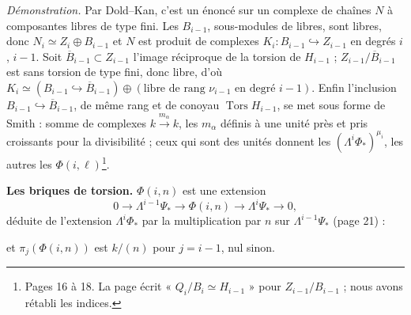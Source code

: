 \documentclass[11pt,a4paper]{article}
\begin{document}
\emph{Démonstration.} Par Dold–Kan, c'est un énoncé sur un complexe de
chaînes $N$ à composantes libres de type fini. Les $B_{i-1}$, sous-modules de
libres, sont libres, donc $N_{i} \simeq Z_{i} \oplus B_{i-1}$ et $N$ est
produit de complexes $K_{i} : B_{i-1} \hookrightarrow Z_{i-1}$ en degrés $i$,
$i-1$. Soit $\overline{B}_{i-1} \subset Z_{i-1}$ l'image réciproque de la
torsion de $H_{i-1}$ ; $Z_{i-1}/\overline{B}_{i-1}$ est sans torsion de type
fini, donc libre, d'où $K_{i} \simeq (B_{i-1} \hookrightarrow
\overline{B}_{i-1}) \oplus (\text{libre de rang } \nu_{i-1} \text{ en degré }
i-1)$. Enfin l'inclusion $B_{i-1} \hookrightarrow \overline{B}_{i-1}$, de
même rang et de conoyau $\operatorname{Tors} H_{i-1}$, se met sous forme de
Smith : somme de complexes $k \xrightarrow{m_{\alpha}} k$, les $m_{\alpha}$
définis à une unité près et pris croissants pour la divisibilité ; ceux qui
sont des unités donnent les $(\Lambda^{i}\Phi_{*})^{\mu_{i}}$, les autres les
$\Phi(i,\ell)$\footnote{Pages 16 à 18. La page écrit
« $Q_{i}/B_{i} \simeq H_{i-1}$ » pour $Z_{i-1}/B_{i-1}$ ; nous avons rétabli
les indices.}.

\textbf{Les briques de torsion.} $\Phi(i,n)$ est une extension
\[
  0 \to \Lambda^{i-1}\Psi_{*} \to \Phi(i,n) \to \Lambda^{i}\Psi_{*} \to 0,
\]
déduite de l'extension $\Lambda^{i}\Phi_{*}$ par la multiplication par $n$
sur $\Lambda^{i-1}\Psi_{*}$ (page 21) :


et $\pi_{j}(\Phi(i,n))$ est $k/(n)$ pour $j = i-1$, nul sinon.
\end{document}

